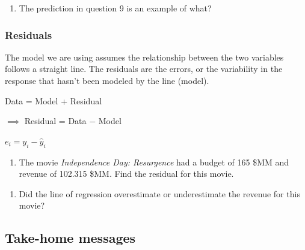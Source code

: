 \documentclass[
]{report}
\providecommand{\tightlist}{%
  \setlength{\itemsep}{0pt}\setlength{\parskip}{0pt}}
\begin{document}
\begin{enumerate}
\def\labelenumi{\arabic{enumi}.}
\setcounter{enumi}{9}
\tightlist
\item
  The prediction in question 9 is an example of what?
\end{enumerate}

\vspace{0.3in}

\hypertarget{residuals}{%
\subsubsection*{Residuals}\label{residuals}}

The model we are using assumes the relationship between the two variables follows a straight line. The residuals are the errors, or the variability in the response that hasn't been modeled by the line (model).

\begin{center}
Data = Model + Residual

$\implies$ Residual = Data $-$ Model

$e_i=y_i-\hat{y}_i$
\end{center}

\begin{enumerate}
\def\labelenumi{\arabic{enumi}.}
\setcounter{enumi}{10}
\tightlist
\item
  The movie \emph{Independence Day: Resurgence} had a budget of 165 \$MM and revenue of 102.315 \$MM. Find the residual for this movie.
\end{enumerate}

\vspace{.8in}

\begin{enumerate}
\def\labelenumi{\arabic{enumi}.}
\setcounter{enumi}{11}
\tightlist
\item
  Did the line of regression overestimate or underestimate the revenue for this movie?
\end{enumerate}

\vspace{.2in}

\hypertarget{take-home-messages-7}{%
\subsection{Take-home messages}\label{take-home-messages-7}}
\end{document}

